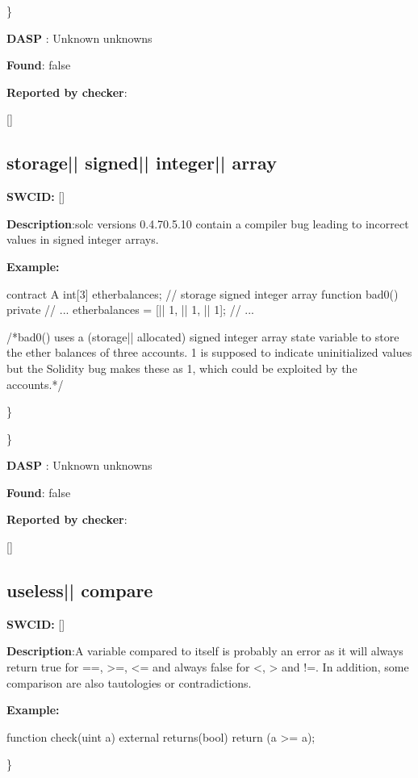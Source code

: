 \documentclass{article}
\begin{document}
\} 

\textbf{DASP} : Unknown unknowns

\textbf{Found}: false

\textbf{Reported by checker}: 
\begin{ffcode} 

[]
\end{ffcode} 
\subsection{storage{|\textunderscore| }signed{|\textunderscore| }integer{|\textunderscore| }array} 
\textbf{SWC{\textunderscore }ID:} []

\textbf{Description}:solc versions 0.4.7{\textendash}0.5.10 contain a compiler bug leading to incorrect values in signed integer arrays.


\textbf{Example:} 
\begin{ffcode} 

contract A {
  int[3] ether\textunderscore balances; // storage signed integer array
  function bad0() private {
    // ...
    ether\textunderscore balances = [|\textendash| 1, |\textendash| 1, |\textendash| 1];
    // ...
  }
}

 /*bad0() uses a (storage|\textendash| allocated) signed integer array state variable to store the ether balances of three accounts. 1 is supposed to indicate uninitialized values but the Solidity bug makes these as 1, which could be exploited by the accounts.*/ 

\end{ffcode} 
\} 

\} 

\textbf{DASP} : Unknown unknowns

\textbf{Found}: false

\textbf{Reported by checker}: 
\begin{ffcode} 

[]
\end{ffcode} 
\subsection{useless{|\textunderscore| }compare} 
\textbf{SWC{\textunderscore }ID:} []

\textbf{Description}:A variable compared to itself is probably an error as it will always return true for ==, >=, <= and always false for <, > and !=. In addition, some comparison are also tautologies or contradictions.


\textbf{Example:} 
\begin{ffcode} 

function check(uint a) external returns(bool){
    return (a >= a);
}

\end{ffcode} 
\} 
\end{document}

